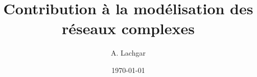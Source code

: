 \documentclass[12pt,french]{book}
\title{Contribution à la modélisation des réseaux complexes}
\author{A. Lachgar}
\date{\today}
\begin{document}
	\sffamily
\frontmatter  
\maketitle


\tableofcontents
\listoffigures
\mainmatter






 
%
%
 

 \appendix
% 
\end{document}
